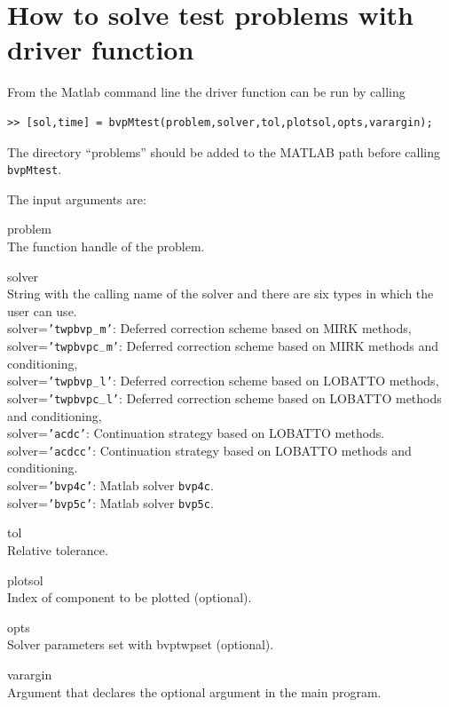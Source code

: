 \documentclass[<options>]{article}
\begin{document}
\section{How to solve test problems with driver function}\label{driver}
From the Matlab command line the driver function can be run by calling
\begin{verbatim}
>> [sol,time] = bvpMtest(problem,solver,tol,plotsol,opts,varargin);
\end{verbatim}
The  directory  ``problems''  should  be added to the MATLAB path before
calling \texttt{bvpMtest}.

The input arguments are:
\begin{list}
{}{%
  \renewcommand\makelabel[1]{\texttt{#1}\hfill}
}
\item[problem]\ \\
The function handle of the problem.
\item[solver]\ \\
String with the calling name of the solver and there are six types in which the user can use.\\
solver=\texttt{'twpbvp$_{-}$m'}: Deferred correction scheme based on MIRK methods,\\
solver=\texttt{'twpbvpc$_{-}$m'}: Deferred correction scheme based on MIRK methods and conditioning,\\
solver=\texttt{'twpbvp$_{-}$l'}: Deferred correction scheme based on LOBATTO methods,\\
solver=\texttt{'twpbvpc$_{-}$l'}: Deferred correction scheme based on LOBATTO methods and conditioning,\\
solver=\texttt{'acdc'}: Continuation strategy based on LOBATTO methods.\\
solver=\texttt{'acdcc'}: Continuation strategy based on LOBATTO methods and conditioning.\\
solver=\texttt{'bvp4c'}: Matlab solver \texttt{bvp4c}.\\
solver=\texttt{'bvp5c'}: Matlab solver \texttt{bvp5c}.\\
\item[tol]\ \\
Relative tolerance.
\item[plotsol]\ \\
Index of component to be plotted (optional).
\item[opts]\ \\
Solver parameters set with bvptwpset (optional).

\item[varargin]\ \\
Argument that declares the optional argument in the main program.
\end{list}
\end{document}
